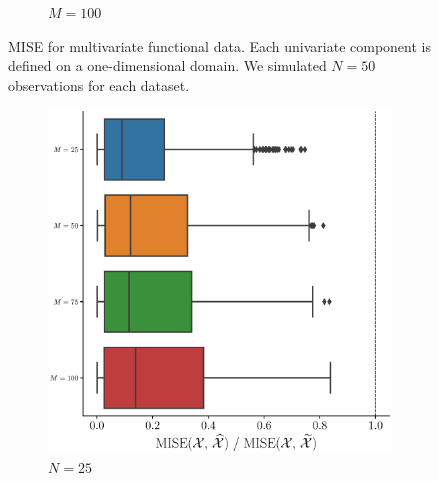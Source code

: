 \begin{results}
\begin{figure}
\begin{subfigure}[b]{0.49\textwidth}
         \caption{$M = 100$}
         \label{fig:mise_mfd_1d_100}
    \end{subfigure}
    \caption{MISE for multivariate functional data. Each univariate component is defined on a one-dimensional domain. We simulated $N = 50$ observations for each dataset.}
    \label{fig:mise_mfd_1d}
\end{figure}

\begin{figure}
     \centering
     \begin{subfigure}[b]{0.49\textwidth}
         \centering
         \includegraphics[width=\textwidth]{figures/scenario_2/mise_N25.eps}
         \caption{$N = 25$}
         \label{fig:mise_mfd_2d_25}
     \end{subfigure}
     \hfill
     \begin{subfigure}[b]{0.49\textwidth}
         \centering

\end{subfigure}
\end{figure}
\end{results}

